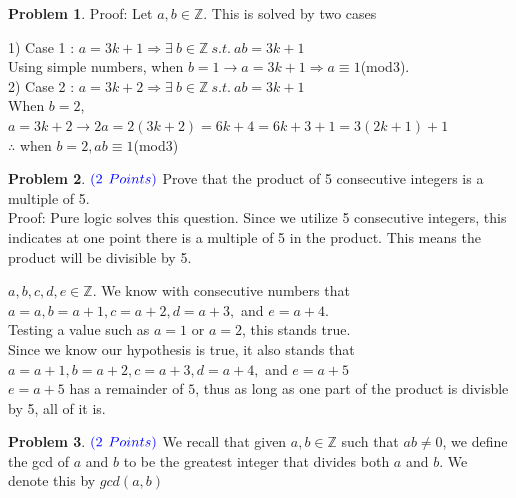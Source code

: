 \documentclass[letterpaper, 12pt]{article}
\theoremstyle{definition}
\newtheorem{pb}{Problem} %
\begin{document}
\begin{spacing}{1.33}
\begin{pb}
    Proof: Let $a, b \in \mathbb{Z}$. This is solved by two cases
    \begin{center}
            1) Case 1 : $a = 3k + 1 \Longrightarrow \exists \: b \in \mathbb{Z} \: s.t. \:  ab = 3k + 1$\\
            Using simple numbers, when $b = 1 \longrightarrow a = 3k + 1 \Longrightarrow a\equiv 1$(mod3).\\
            \vspace{5mm}
            2) Case 2 : $a = 3k + 2 \Longrightarrow \exists \: b \in \mathbb{Z} \: s.t. \:  ab = 3k + 1$\\
            When $b = 2$, $a = 3k +2 \longrightarrow 2a = 2(3k + 2) = 6k + 4 = 6k + 3 + 1 = 3(2k + 1) + 1$\\
            $\therefore$ when $b = 2, ab \equiv 1$(mod3)
            
    \end{center}
\end{pb}


\vspace{5cm}
\begin{pb}
    $\color{blue}{(2}$ $\color{blue}{Points)}$ Prove that the product of 5 consecutive integers is a multiple of 5.\\


    Proof: Pure logic solves this question. Since we utilize 5 consecutive integers, this indicates at one point there is a multiple of 5 in the product. This means the product will be divisible by 5.

    \begin{center}
        $a, b, c, d, e \in \mathbb{Z}$. We know with consecutive numbers that $a=a, b = a+1, c = a+2, d = a+3,$ and $e = a + 4$.\\
        Testing a value such as $a=1$ or $a=2$, this stands true.\\
        Since we know our hypothesis is true, it also stands that $a=a+1, b = a+2, c = a+3, d = a+4,$ and $e = a + 5$\\
        $e = a + 5$ has a remainder of $5$, thus as long as one part of the product is divisble by 5, all of it is.
        
    \end{center}

    
\end{pb}



\begin{pb}
    $\color{blue}{(2}$ $\color{blue}{Points)}$ We recall that given $a, b \in \mathbb{Z}$ such that $ab \neq 0$, we define the gcd of $a$ and $b$ to be the greatest integer that divides both $a$ and $b$. We denote this by $gcd(a,b)$\\
    

\end{pb}
\end{spacing}
\end{document}
